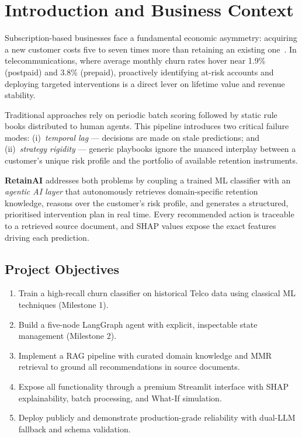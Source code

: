 \documentclass[11pt]{article}
\begin{document}
\tableofcontents
\thispagestyle{fancy}
\newpage

\section{Introduction and Business Context}
\label{sec:intro}

Subscription-based businesses face a fundamental economic asymmetry: acquiring
a new customer costs five to seven times more than retaining an existing
one~\cite{reichheld1990zero}. In telecommunications, where average monthly
churn rates hover near 1.9\% (postpaid) and 3.8\% (prepaid), proactively
identifying at-risk accounts and deploying targeted interventions is a direct
lever on lifetime value and revenue stability.

Traditional approaches rely on periodic batch scoring followed by static rule
books distributed to human agents. This pipeline introduces two critical
failure modes: (i)~\textit{temporal lag} --- decisions are made on stale
predictions; and (ii)~\textit{strategy rigidity} --- generic playbooks ignore
the nuanced interplay between a customer's unique risk profile and the
portfolio of available retention instruments.

\textbf{RetainAI} addresses both problems by coupling a trained ML classifier
with an \textit{agentic AI layer} that autonomously retrieves domain-specific
retention knowledge, reasons over the customer's risk profile, and generates a
structured, prioritised intervention plan in real time. Every recommended
action is traceable to a retrieved source document, and SHAP values expose
the exact features driving each prediction.

\subsection{Project Objectives}

\begin{enumerate}
  \item Train a high-recall churn classifier on historical Telco data using
        classical ML techniques (Milestone 1).
  \item Build a five-node LangGraph agent with explicit, inspectable state
        management (Milestone 2).
  \item Implement a RAG pipeline with curated domain knowledge and MMR
        retrieval to ground all recommendations in source documents.
  \item Expose all functionality through a premium Streamlit interface with
        SHAP explainability, batch processing, and What-If simulation.
  \item Deploy publicly and demonstrate production-grade reliability with
        dual-LLM fallback and schema validation.
\end{enumerate}
\end{document}

